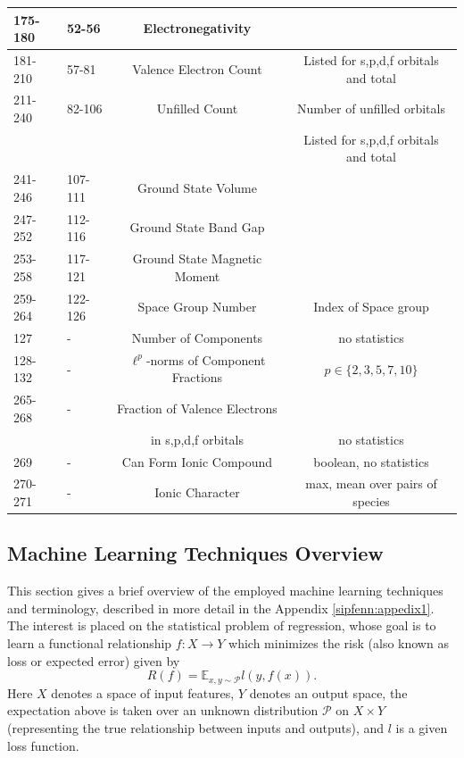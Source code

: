 \begin{table}[H]
\begin{tabular}{|p{2cm}|p{2cm}|c|c|}
        \hline
        175-180 & 52-56 & Electronegativity & \\ 
        \hline
        181-210 & 57-81 & Valence Electron Count & Listed for s,p,d,f orbitals and total \\ 
        \hline
        211-240 & 82-106 & Unfilled Count & Number of unfilled orbitals \\
         & & & Listed for s,p,d,f orbitals and total \\
         \hline
        241-246 & 107-111 & Ground State Volume & \\ 
        \hline
        247-252 & 112-116 & Ground State Band Gap & \\ 
        \hline
        253-258 & 117-121 & Ground State Magnetic Moment & \\ 
        \hline
        259-264 & 122-126 & Space Group Number & Index of Space group\\
        \hline
        127 & - & Number of Components & no statistics \\
        \hline
        128-132 & - & $\ell^p$-norms of Component Fractions & $p \in \{2,3,5,7,10\}$ \\
        \hline
        265-268 & - & Fraction of Valence Electrons & \\
        & & in s,p,d,f orbitals & no statistics\\
        \hline
        269 & - & Can Form Ionic Compound & boolean, no statistics\\
        \hline
        270-271 & - & Ionic Character & max, mean over pairs of species\\
        \hline
    \end{tabular}
    \label{sipfenn:feature-table}
\end{table}

\subsection{Machine Learning Techniques Overview} \label{sipfenn:ref:machinelearningoverview}
This section gives a brief overview of the employed machine learning techniques and terminology, described in more detail in the Appendix \ref{sipfenn:appedix1}. The interest is placed on the statistical problem of regression, whose goal is to learn a functional relationship $f:X\rightarrow Y$ which minimizes the risk (also known as loss or expected error) \cite{vapnik1999overview} given by
\begin{equation}\label{sipfenn:true_risk}
    R(f) = \mathbb{E}_{x,y\sim \mathcal{P}} l(y,f(x)).
\end{equation}
Here $X$ denotes a space of input features, $Y$ denotes an output space, the expectation above is taken over an unknown distribution $\mathcal{P}$ on $X\times Y$ (representing the true relationship between inputs and outputs), and $l$ is a given loss function. 

